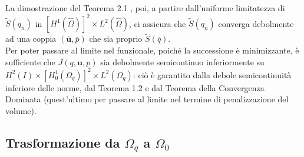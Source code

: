 \documentclass[a4paper,11pt,twoside]{article}
\renewcommand{\u}{\mathbf{u}}
\theoremstyle{plain}
\theoremstyle{definition}
\theoremstyle{remark}
\begin{document}
La dimostrazione del Teorema 2.1 \cite{Gunzburger2000}, poi, a partire dall'uniforme limitatezza di $\widetilde{S}(q_n)$ in $[H^1(\hat{\Omega})]^2\times L^2(\hat{\Omega})$, ci assicura che $\widetilde{S}(q_n)$ converga debolmente ad una coppia $(\overline{\u},\overline{p})$ che sia proprio $\widetilde{S}(\overline{q})$.\\
Per poter passare al limite nel funzionale, poich\'e la successione \`e minimizzante, \`e sufficiente che $J(q,\mathbf{u},p)$ sia debolmente semicontinuo inferiormente su $H^2(I)\times [H^1_0(\Omega_q)]^2\times L^2(\Omega_q)$: ci\`o \`e garantito dalla debole semicontinuit\`a inferiore delle norme, dal Teorema 1.2 \cite{Gunzburger2000} e dal Teorema della Convergenza Dominata (quest'ultimo per passare al limite nel termine di penalizzazione del volume).%


\subsection{Trasformazione da $\Omega_q$ a $\Omega_0$}\label{sec:trasformazione}
\end{document}
